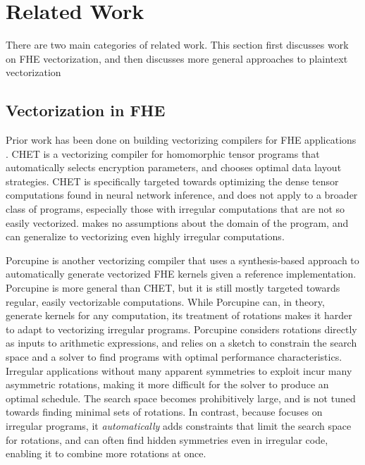 \section{Related Work}\label{sec:related-work}
There are two main categories of related work. This section first discusses work on FHE vectorization, and then discusses more general approaches to plaintext vectorization


\subsection{Vectorization in FHE}
Prior work has been done on building vectorizing compilers for FHE applications \cite{CHET, Porcupine}.
CHET \cite{CHET} is a vectorizing compiler for homomorphic tensor programs that automatically selects encryption parameters, and chooses optimal data layout strategies.
CHET is specifically targeted towards optimizing the dense tensor computations found in neural network inference, and does not apply to a broader class of programs, especially those with irregular computations that are not so easily vectorized.
\system makes no assumptions about the domain of the program, and can generalize to vectorizing even highly irregular computations.

Porcupine \cite{Porcupine} is another vectorizing compiler that uses a synthesis-based approach to automatically generate vectorized FHE kernels given a reference implementation.
Porcupine is more general than CHET, but it is still mostly targeted towards regular, easily vectorizable computations.
While Porcupine can, in theory, generate kernels for any computation, its treatment of rotations makes it harder to adapt to vectorizing irregular programs.
Porcupine considers rotations directly as inputs to arithmetic expressions, and relies on a sketch to constrain the search space and a solver to find programs with optimal performance characteristics.
Irregular applications without many apparent symmetries to exploit incur many asymmetric rotations, making it more difficult for the solver to produce an optimal schedule. The search space becomes prohibitively large, and is not tuned towards finding minimal sets of rotations.
In contrast, because \system focuses on irregular programs, it {\em automatically} adds constraints that limit the search space for rotations, and can often find hidden symmetries even in irregular code, enabling it to combine more rotations at once.

